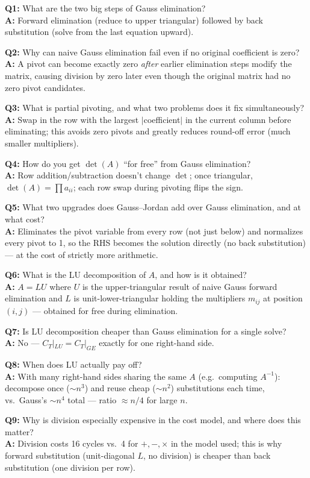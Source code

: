 \begin{qabox}
\textbf{Q1:} What are the two big steps of Gauss elimination? \\
\textbf{A:} Forward elimination (reduce to upper triangular) followed by back substitution (solve from the last equation upward).

\textbf{Q2:} Why can naive Gauss elimination fail even if no original coefficient is zero? \\
\textbf{A:} A pivot can become exactly zero \emph{after} earlier elimination steps modify the matrix, causing division by zero later even though the original matrix had no zero pivot candidates.

\textbf{Q3:} What is partial pivoting, and what two problems does it fix simultaneously? \\
\textbf{A:} Swap in the row with the largest $|$coefficient$|$ in the current column before eliminating; this avoids zero pivots and greatly reduces round-off error (much smaller multipliers).

\textbf{Q4:} How do you get $\det(A)$ ``for free'' from Gauss elimination? \\
\textbf{A:} Row addition/subtraction doesn't change $\det$; once triangular, $\det(A)=\prod a_{ii}$; each row swap during pivoting flips the sign.

\textbf{Q5:} What two upgrades does Gauss--Jordan add over Gauss elimination, and at what cost? \\
\textbf{A:} Eliminates the pivot variable from every row (not just below) and normalizes every pivot to 1, so the RHS becomes the solution directly (no back substitution) — at the cost of strictly more arithmetic.

\textbf{Q6:} What is the LU decomposition of $A$, and how is it obtained? \\
\textbf{A:} $A=LU$ where $U$ is the upper-triangular result of naive Gauss forward elimination and $L$ is unit-lower-triangular holding the multipliers $m_{ij}$ at position $(i,j)$ — obtained for free during elimination.

\textbf{Q7:} Is LU decomposition cheaper than Gauss elimination for a single solve? \\
\textbf{A:} No — $C_T|_{LU}=C_T|_{GE}$ exactly for one right-hand side.

\textbf{Q8:} When does LU actually pay off? \\
\textbf{A:} With many right-hand sides sharing the same $A$ (e.g.\ computing $A^{-1}$): decompose once ($\sim n^3$) and reuse cheap ($\sim n^2$) substitutions each time, vs.\ Gauss's $\sim n^4$ total — ratio $\approx n/4$ for large $n$.

\textbf{Q9:} Why is division especially expensive in the cost model, and where does this matter? \\
\textbf{A:} Division costs 16 cycles vs.\ 4 for $+,-,\times$ in the model used; this is why forward substitution (unit-diagonal $L$, no division) is cheaper than back substitution (one division per row).
\end{qabox}
